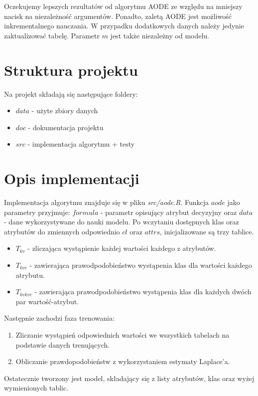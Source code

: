 \documentclass[16]{article}
\begin{document}
Oczekujemy lepszych rezultatów od algorytmu AODE ze względu na mniejszy nacisk na niezależność argumentów. Ponadto, zaletą AODE jest możliwość inkrementalnego nauczania. W przypadku dodatkowych danych należy jedynie zaktualizować tabelę. Parametr $m$ jest także niezależny od modelu. 

\section{Struktura projektu}

Na projekt składają się następujące foldery:
\begin{itemize}
  \item $data$  - użyte zbiory danych
  \item $doc$   - dokumentacja projektu
  \item $src$   - implementacja algorytmu + testy
\end{itemize} 

\section{Opis implementacji}
Implementacja algorytmu znajduje się w pliku \textit{src/aode.R}.
Funkcja $aode$ jako parametry przyjmuje: $formula$ - parametr opisujący atrybut decyzyjny oraz $data$ - dane wykorzystywane do nauki modelu. Po wczytaniu dostępnych klas oraz atrybutów do zmiennych odpowiednio $cl$ oraz $attrs$, inicjalizowane są trzy tablice. 
\begin{itemize}
\item $T_{kv}$ - zliczająca wystąpienie każdej wartości każdego z atrybutów. 
\item $T_{kvc}$ - zawierająca prawodpodobieństwo wystąpenia klas dla wartości każdego atrybutu. 
\item $T_{kvkvc}$ - zawierająca prawodpodobieństwo wystąpenia klas dla każdych dwóch par wartość-atrybut.
\end{itemize}
Następnie zachodzi faza trenowania: 
\begin{enumerate}
\item Zliczanie wystąpień odpowiednich wartości we wszystkich tabelach na podstawie danych trenujących.
\item Obliczanie prawdopodobieństw z wykorzystaniem estymaty Laplace'a.
\end{enumerate}

Ostatecznie tworzony jest model, składający się z listy atrybutów, klas oraz wyżej wymienionych tablic. \\
\end{document}
